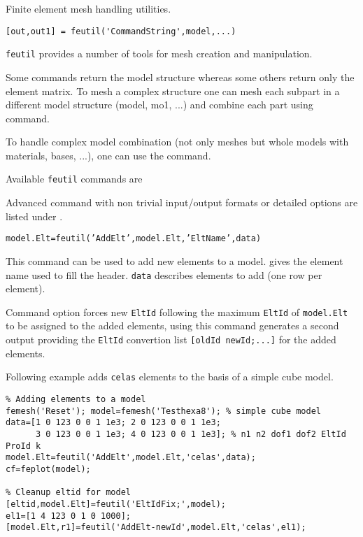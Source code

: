 

Finite element mesh handling utilities.

\rsyntax
\begin{verbatim}
[out,out1] = feutil('CommandString',model,...)
\end{verbatim}


{\tt feutil} provides a number of tools for mesh creation and manipulation. 

Some commands return the model structure whereas some others return only the element matrix.
To mesh a complex structure one can mesh each subpart in a different model structure (model, mo1, ...) and combine each part using  command. 
\begin{SDT}
To handle complex model combination (not only meshes but whole models with materials, bases, ...), one can use the  command.
\end{SDT}

\noindent Available {\tt feutil} commands are

Advanced command with non trivial input/output formats or detailed options are listed under .

{\tt model.Elt=feutil('AddElt',model.Elt,'EltName',data)}

This command can be used to add new elements to a model.  gives the element name used to fill the header. {\tt data} describes elements to add (one row per element).

Command option  forces new {\tt EltId} following the maximum {\tt EltId} of {\tt model.Elt} to be assigned to the added elements, using this command generates a second output providing the {\tt EltId} convertion list {\tt [oldId newId;...]} for the added elements.

Following example adds {\tt celas} elements to the basis of a simple cube model.
\begin{verbatim}
% Adding elements to a model 
femesh('Reset'); model=femesh('Testhexa8'); % simple cube model
data=[1 0 123 0 0 1 1e3; 2 0 123 0 0 1 1e3;
      3 0 123 0 0 1 1e3; 4 0 123 0 0 1 1e3]; % n1 n2 dof1 dof2 EltId ProId k
model.Elt=feutil('AddElt',model.Elt,'celas',data);
cf=feplot(model);

% Cleanup eltid for model
[eltid,model.Elt]=feutil('EltIdFix;',model);
el1=[1 4 123 0 1 0 1000];
[model.Elt,r1]=feutil('AddElt-newId',model.Elt,'celas',el1);
\end{verbatim}%


